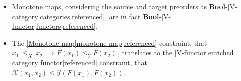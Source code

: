 
\begin{itemize}
    \item  Monotone maps, considering the source and target preorders as \textbf{Bool}-\ref{V-category|categories|referenced}, are in fact \textbf{Bool}-\ref{V-functor|functors|referenced}.
    \item The \ref{Monotone map|monotone map|referenced} constraint, that \,$x_1\ \leq_X\ x_2 \implies F(x_1)\leq_Y F(x_2)$\,, translates to the \ref{V-functor|enriched category functor|referenced} constraint, that \,$\mathcal{X}(x_1,x_2) \leq \mathcal{Y}(F(x_1),F(x_2))$\,.
  \end{itemize}
